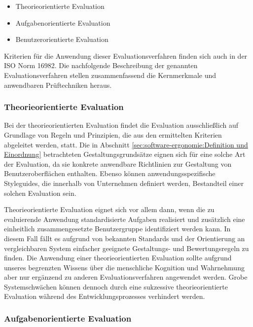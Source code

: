 \begin{itemize}
\item Theorieorientierte Evaluation
\item Aufgabenorientierte Evaluation
\item Benutzerorientierte Evaluation
\end{itemize}

Kriterien für die Anwendung dieser Evaluationsverfahren finden sich auch in der ISO Norm 16982. Die nachfolgende Beschreibung der genannten Evaluationsverfahren stellen zusammenfassend die Kernmerkmale und anwendbaren Prüftechniken heraus.

\subsubsection{Theorieorientierte Evaluation}

Bei der theorieorientierten Evaluation findet die Evaluation ausschließlich auf Grundlage von Regeln und Prinzipien, die aus den ermittelten Kriterien abgeleitet werden, statt. \parencite[vgl.][208]{Herczeg2009} Die in Abschnitt \ref{sec:software-ergonomie:Definition und Einordnung} betrachteten Gestaltungsgrundsätze eignen sich für eine solche Art der Evaluation, da sie konkrete anwendbare Richtlinien zur Gestaltung von Benutzeroberflächen enthalten. Ebenso können anwendungsspezifische Styleguides, die innerhalb von Unternehmen definiert werden, Bestandteil einer solchen Evaluation sein.

Theorieorientierte Evaluation eignet sich vor allem dann, wenn die zu evaluierende Anwendung standardisierte Aufgaben realisiert und zusätzlich eine einheitlich zusammengesetzte Benutzergruppe identifiziert werden kann. In diesem Fall fällt es aufgrund von bekannten Standards und der Orientierung an vergleichbaren System einfacher geeignete Gestaltungs- und Bewertungsregeln zu finden. Die Anwendung einer theorieorientierten Evaluation sollte aufgrund unseres begrenzten Wissens über die menschliche Kognition und Wahrnehmung aber nur ergänzend zu anderen Evaluationsverfahren angewendet werden. \parencite[vgl.][209]{Herczeg2009} Grobe Systemschwächen können dennoch durch eine sukzessive theorieorientierte Evaluation während des Entwicklungsprozesses verhindert werden.

\subsubsection{Aufgabenorientierte Evaluation}

